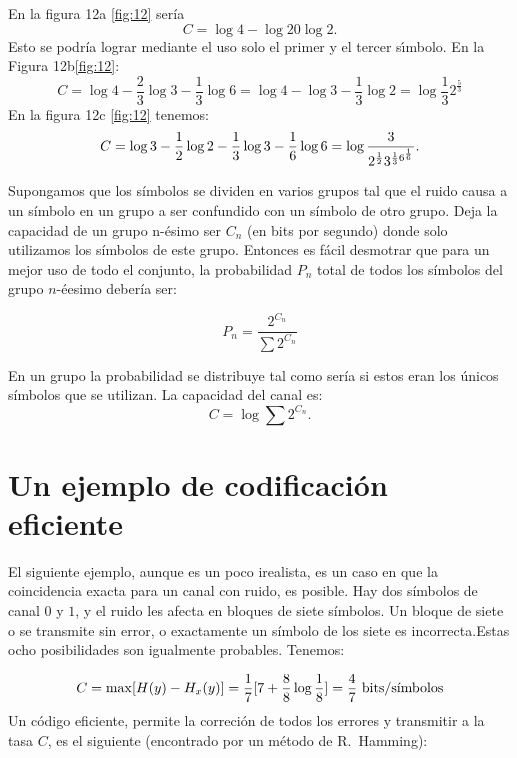 En la figura 12a \ref{fig:12} ser\'ia
\begin{equation}
  C =  \log{4} - \log{2} 0 \log{2}.
\end{equation}
Esto se podr\'ia lograr mediante el uso solo el primer y el tercer
s\'{\i}mbolo. En la Figura 12b\ref{fig:12}:
\begin{equation}
  C = \log{4} - \frac{2}{3}\log{3} - \frac{1}{3}\log{6}
  = \log{4} - \log{3} - \frac{1}{3}\log{2}
  = \log{\frac{1}{3}} 2^{\frac{5}{3}}
\end{equation}
En la figura 12c \ref{fig:12} tenemos:
\begin{equation}
  C = \log{3} - \frac{1}{2}\log{2} - \frac{1}{3}\log{3} - \frac{1}{6} \log{6} \\
  = \log  {\frac{3}{ 2^{\frac{1}{2}} 3^{\frac{1}{3} 6^{\frac{1}{6} }}}}.
\end{equation}

Supongamos que los s\'imbolos se dividen en varios grupos tal que el
ruido causa a un s\'imbolo en un grupo a ser confundido con un
s\'imbolo de otro grupo. Deja la capacidad de un grupo n-\'esimo ser
$C_n$ (en bits por segundo) donde solo utilizamos los s\'imbolos de
este grupo. Entonces es f\'acil desmotrar que para un mejor uso de todo el conjunto, la
probabilidad $P_n$ total de todos los s\'imbolos del grupo $n$-\'{e}esimo
deber\'ia ser:

\begin{equation}
  P_n = \frac{2^{C_n}}{\sum 2^{C_n}}
\end{equation}

En un grupo la probabilidad se distribuye tal como ser\'ia si estos eran los \'unicos s\'imbolos que se utilizan. 
La capacidad del canal es:
\begin{equation}
  C = \log{\sum 2^{C_n}}.
\end{equation}

\clearpage

\chapter{Un ejemplo de codificaci\'on eficiente}
\label{sec:17}

El siguiente ejemplo, aunque es un poco irealista, es un caso en que la
coincidencia exacta para un canal con ruido, es posible. Hay dos
s\'imbolos de canal $0$ y $1$, y el ruido les afecta en bloques de siete
s\'imbolos.  Un bloque de siete o se transmite sin error, o
exactamente un s\'imbolo de los siete es incorrecta.Estas ocho
posibilidades son igualmente probables. Tenemos:

\begin{equation}
C = \max [ H(y) - H_x(y) ]
= \frac{1}{7}[7 + \frac{8}{8}\log{\frac{1}{8}}]
= \frac{4}{7} \text{ bits}/\text{s\'{\i}mbolos}
\end{equation}
Un c\'odigo eficiente, permite la correci\'on de todos los errores y
transmitir a la tasa $C$, es el siguiente (encontrado por un m\'etodo
de R.\ Hamming):
